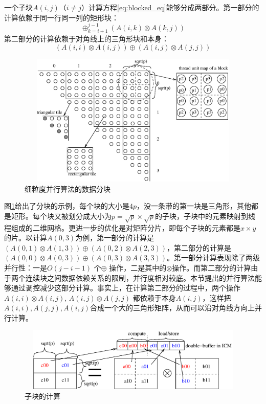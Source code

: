 \begin{flushleft}
一个子块$A(i,j)$（$i \ne j$）计算方程\ref{eq:blocked_eq}能够分成两部分。第一部分的计算依赖于同一行同一列的矩形块：
\begin{displaymath}
\oplus_{k=i+1}^{j-1}(A(i,k)\otimes A(k,j))
\end{displaymath}
第二部分的计算依赖于对角线上的三角形块和本身：
\begin{displaymath}
(A(i,i)\otimes A(i,j))\oplus(A(i,j)\otimes A(j,j))
\end{displaymath}
\begin{figure}[htbp]
	\begin{center}
		\includegraphics[width=5in,height=2.5in]{Img/Chap_Algorithm/blocked_pdp}
		\caption{细粒度并行算法的数据分块}
		\label{fig:blocked_pdp}
	\end{center}
\end{figure}

图\ref{fig:blocked_pdp}给出了分块的示例，每个块的大小是$4p$，没一条带的第一块是三角形，其他都是矩形。每个块又被划分成大小为$p=\sqrt{p}\times\sqrt{p}$的子块，子块中的元素映射到线程组成的二维网格。更进一步的优化是对矩阵分片，即每个子块的元素都是$x\times y$的片。以计算$A(0,3)$为例，第一部分的计算是$(A(0,1)\otimes A(1,3))\oplus(A(0,2)\otimes A(2,3))$，第二部分的计算是$(A(0,0)\otimes A(0,3))\oplus(A(0,3)\otimes A(3,3))$。第一部分计算表现除了两级并行性：一是$O(j-i-1)$ 个$\oplus$ 操作，二是其中的$\otimes$操作。而第二部分的计算由于两个连续块之间数据依赖关系的限制，并行度相对较底。本节提出的并行算法能够通过调控减少这部分计算。事实上，在计算第二部分的过程中，两个操作$A(i,i)\otimes A(i,j)$, $A(i,j)\otimes A(j,j)$ 都依赖于本身$A(i,j)$，这样把$A(i, i), A(j, j), A(i, j)$合成一个大的三角形矩阵，从而可以沿对角线方向上并行计算。
\begin{figure}[htbp]
	\begin{center}
		\includegraphics[width=4.5in,height=1.2in]{Img/Chap_Algorithm/sub_block}
		\caption{子块的计算}
		\label{fig:sub_block}
	\end{center}
\end{figure}


\end{flushleft}
